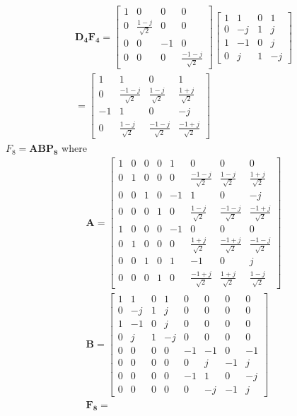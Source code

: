 \documentclass[journal,12pt,twocolumn]{IEEEtran}
\let\vec\mathbf
\numberwithin{equation}{section}
\renewcommand\thesection{\arabic{section}}
\begin{document}
\begin{enumerate}[label=\arabic*.,ref=\thesection.\theenumi]
\begin{align}
\vec{D_4F_4}=\begin{bmatrix}
1&0&0&0\\0&\frac{1-j}{\sqrt{2}}&0&0\\0&0&-1&0\\0&0&0&\frac{-1-j}{\sqrt{2}}
\end{bmatrix}\begin{bmatrix}
1&1&0&1\\0&-j&1&j\\1&-1&0&j\\0&j&1&-j
\end{bmatrix}\\
=\begin{bmatrix}
1&1&0&1\\0&\frac{-1-j}{\sqrt{2}}&\frac{1-j}{\sqrt{2}}&\frac{1+j}{\sqrt{2}}\\-1&1&0&-j\\0&\frac{1-j}{\sqrt{2}}&\frac{-1-j}{\sqrt{2}}&\frac{-1+j}{\sqrt{2}}
\end{bmatrix}
\end{align}
$F_8=\vec{ABP_8}$ where
\begin{align}
\vec{A}=\begin{bmatrix}
1&0&0&0&1&0&0&0\\0&1&0&0&0&\frac{-1-j}{\sqrt{2}}&\frac{1-j}{\sqrt{2}}&\frac{1+j}{\sqrt{2}}\\0&0&1&0&-1&1&0&-j\\0&0&0&1&0&\frac{1-j}{\sqrt{2}}&\frac{-1-j}{\sqrt{2}}&\frac{-1+j}{\sqrt{2}}\\1&0&0&0&-1&0&0&0\\0&1&0&0&0&\frac{1+j}{\sqrt{2}}&\frac{-1+j}{\sqrt{2}}&\frac{-1-j}{\sqrt{2}}\\0&0&1&0&1&-1&0&j\\0&0&0&1&0&\frac{-1+j}{\sqrt{2}}&\frac{1+j}{\sqrt{2}}&\frac{1-j}{\sqrt{2}}
\end{bmatrix}\\ \vec{B}=\begin{bmatrix}
1&1&0&1&0&0&0&0\\0&-j&1&j&0&0&0&0\\1&-1&0&j&0&0&0&0\\0&j&1&-j&0&0&0&0\\0&0&0&0&-1&-1&0&-1\\0&0&0&0&0&j&-1&j\\0&0&0&0&-1&1&0&-j\\0&0&0&0&0&-j&-1&j
\end{bmatrix}\\
\vec{F_8}=\
\end{align}

\end{enumerate}
\end{document}
